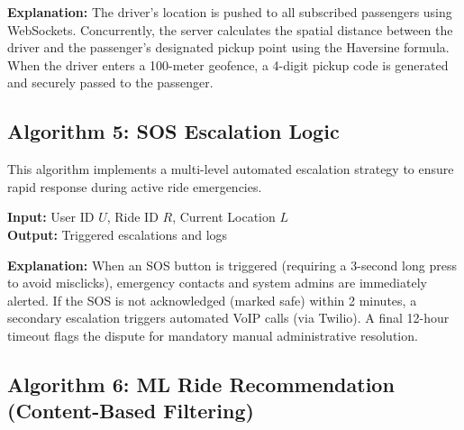 \textbf{Explanation:} The driver's location is pushed to all subscribed passengers using WebSockets. Concurrently, the server calculates the spatial distance between the driver and the passenger's designated pickup point using the Haversine formula. When the driver enters a 100-meter geofence, a 4-digit pickup code is generated and securely passed to the passenger.

\subsection{Algorithm 5: SOS Escalation Logic}

This algorithm implements a multi-level automated escalation strategy to ensure rapid response during active ride emergencies.

\begin{algorithm}[H]
\small
\caption{SOS Multi-Level Escalation}
\textbf{Input:} User ID $U$, Ride ID $R$, Current Location $L$ \\
\textbf{Output:} Triggered escalations and logs
\begin{algorithmic}[1]
        \State \Return
    \EndIf
    
    \State {}
    \State {} 
    \State {} 
    \State {}
        \State {}
        \State {}
        \State {} 
            \State {}
        \EndIf
    \EndIf
\EndFunction
\end{algorithmic}
\end{algorithm}


\textbf{Explanation:} When an SOS button is triggered (requiring a 3-second long press to avoid misclicks), emergency contacts and system admins are immediately alerted. If the SOS is not acknowledged (marked safe) within 2 minutes, a secondary escalation triggers automated VoIP calls (via Twilio). A final 12-hour timeout flags the dispute for mandatory manual administrative resolution.

\subsection{Algorithm 6: ML Ride Recommendation (Content-Based Filtering)}

